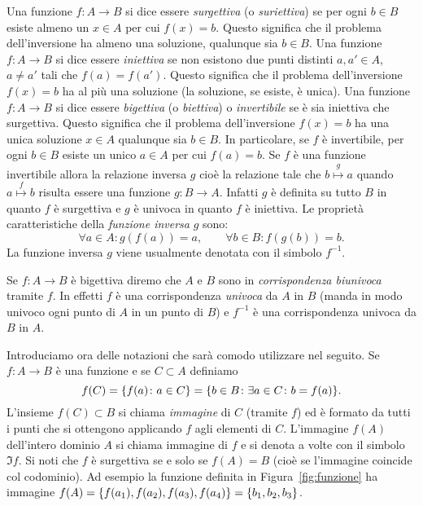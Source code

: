 Una funzione $f\colon A \to B$ si dice essere \emph{surgettiva}%
%
 (o \emph{suriettiva})
se per ogni $b\in B$ esiste almeno un $x\in A$ per cui $f(x)=b$. Questo
significa che il problema dell'inversione ha almeno una soluzione, qualunque
sia $b\in B$.
Una funzione $f\colon A \to B$ si dice essere \emph{iniettiva}%
%
se non esistono due punti distinti $a,a' \in A$, $a\neq a'$ tali
che $f(a) = f(a')$. Questo significa che il problema dell'inversione
$f(x)=b$ ha al più una soluzione (la soluzione, se esiste, è unica).
Una funzione $f\colon A \to B$ si dice essere \emph{bigettiva}%
%
(o \emph{biettiva})
%
%
%
%
%
%
o
\emph{invertibile}%
%
%
se è sia iniettiva che surgettiva. Questo significa
che il problema dell'inversione $f(x)=b$ ha una unica soluzione $x\in A$
qualunque sia $b\in B$. In particolare, se $f$ è invertibile, per ogni $b\in B$ esiste
un unico $a\in A$ per cui $f(a)=b$.
Se $f$ è una funzione invertibile allora la relazione inversa $g$
cioè la relazione tale che $b\stackrel g \mapsto a$ quando $a \stackrel f \mapsto b$
risulta essere una funzione $g\colon B\to A$. 
Infatti $g$ è definita su tutto $B$ in quanto $f$ è surgettiva 
e $g$ è univoca in quanto $f$ è iniettiva.
Le proprietà caratteristiche della \emph{funzione inversa}%
%
 $g$ sono:
\begin{equation}\label{eq:572098}
  \forall a\in A\colon g(f(a)) = a, \qquad
  \forall b\in B\colon f(g(b)) = b.
\end{equation}
La funzione inversa $g$ viene usualmente denotata con il simbolo $f^{-1}$.

Se $f\colon A\to B$ è bigettiva diremo che $A$ 
e $B$ sono in \emph{corrispondenza biunivoca}%
%
 tramite $f$.
In effetti $f$ è una corrispondenza \emph{univoca} da $A$ in $B$
(manda in modo univoco ogni punto di $A$ in un punto di $B$)
e $f^{-1}$ è una corrispondenza univoca da $B$ in $A$.

Introduciamo ora delle notazioni che sarà comodo utilizzare nel seguito.
Se $f\colon A \to B$ è una funzione e se $C\subset A$ definiamo
\[
  f(C) 
  = {\left\{ f(a)\colon a \in C \right\}} 
  = {\left\{ b\in B\colon \exists a\in C\colon b=f(a) \right\}}.
\]
L'insieme $f(C)\subset B$ si chiama \emph{immagine}%
%
%
di $C$ (tramite $f$) ed è formato
da tutti i punti che si ottengono applicando $f$ agli elementi di $C$.
L'immagine $f(A)$ dell'intero dominio $A$ si chiama immagine di $f$
e si denota a volte con il simbolo $\Im f$.
Si noti che $f$ è surgettiva se e solo se $f(A)=B$ (cioè se l'immagine coincide
col codominio).
Ad esempio la funzione definita in Figura~\ref{fig:funzione}
ha immagine $f(A) = {\left\{ f(a_1),f(a_2),f(a_3),f(a_4) \right\}} 
 = {\left\{ b_1, b_2, b_3 \right\}}$.

